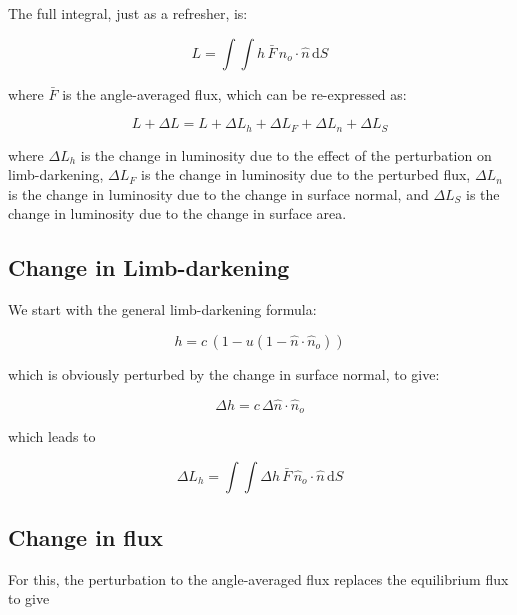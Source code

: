 \documentclass[11pt]{amsart}
\begin{document}
The full integral, just as a refresher, is:

\begin{equation}
L = \int \int h \, \bar{F} \, \hat{n}_{o} \! \cdot \! \hat{n} \, \text{d}S
\end{equation}

where $\bar{F}$ is the angle-averaged flux, which can be re-expressed as:

\begin{equation}
L + \Delta L = L + \Delta L_{h} + \Delta L_{F} + \Delta L_{n} + \Delta L_{S}
\end{equation}

where $\Delta L_{h}$ is the change in luminosity due to the effect of the perturbation on limb-darkening, $\Delta L_{F}$ is the change in luminosity due to the perturbed flux, $\Delta L_{n}$ is the change in luminosity due to the change in surface normal, and $\Delta L_{S}$ is the change in luminosity due to the change in surface area.

\subsection{Change in Limb-darkening} \label{Lum:LD}

We start with the general limb-darkening formula:

\begin{equation}
h = c \, ( 1 - u (1 - \hat{n} \! \cdot \! \hat{n}_{o}) )
\end{equation}

which is obviously perturbed by the change in surface normal, to give:

\begin{equation}
\Delta h = c \, \Delta \hat{n} \! \cdot \! \hat{n}_{o}
\end{equation}

which leads to

\begin{equation}
\Delta L_{h} = \int \int \Delta h \, \bar{F} \, \hat{n}_{o} \! \cdot \! \hat{n} \, \text{d}S
\end{equation}



\subsection{Change in flux} \label{Lum:F}

For this, the perturbation to the angle-averaged flux replaces the equilibrium flux to give
\end{document}
